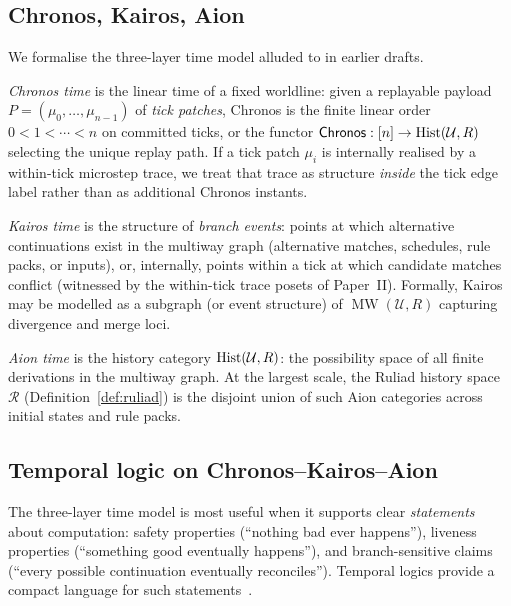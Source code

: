 \documentclass{aion}
\DeclareMathOperator{\MW}{MW}
\newcommand{\Ruliad}{\mathcal{R}}
\newcommand{\Chronos}{\mathsf{Chronos}}
\begin{document}
\subsection{Chronos, Kairos, Aion}
\label{subsec:chronos-kairos-aion}

We formalise the three-layer time model alluded to in earlier drafts.

\begin{definition}[Chronos]\label{def:chronos}
\emph{Chronos time} is the linear time of a fixed worldline:
given a replayable payload $P=(\mu_0,\ldots,\mu_{n-1})$ of \emph{tick patches}, Chronos is the finite linear order
$0<1<\cdots<n$ on committed ticks, or the functor $\Chronos:[n]\to\Hist(\mathcal{U},R)$ selecting the unique replay path.
If a tick patch $\mu_i$ is internally realised by a within-tick microstep trace, we treat that trace as structure \emph{inside}
the tick edge label rather than as additional Chronos instants.
\end{definition}

\begin{definition}[Kairos]\label{def:kairos}
\emph{Kairos time} is the structure of \emph{branch events}:
points at which alternative continuations exist in the multiway graph (alternative matches, schedules, rule packs, or inputs),
or, internally, points within a tick at which candidate matches conflict (witnessed by the within-tick trace posets of Paper~II).
Formally, Kairos may be modelled as a subgraph (or event structure) of $\MW(\mathcal{U},R)$ capturing divergence and merge loci.
\end{definition}

\begin{definition}[Aion]\label{def:aion}
\emph{Aion time} is the history category $\operatorname{Hist}(\mathcal{U},R)$: the possibility space of all finite derivations in the multiway graph.
At the largest scale, the Ruliad history space $\Ruliad$ (Definition~\ref{def:ruliad}) is the disjoint union of such Aion categories across initial states and rule packs.
\end{definition}

\subsection{Temporal logic on Chronos--Kairos--Aion}
\label{subsec:temporal-logic}

The three-layer time model is most useful when it supports clear \emph{statements} about computation:
safety properties (``nothing bad ever happens''), liveness properties (``something good eventually happens''),
and branch-sensitive claims (``every possible continuation eventually reconciles'').
Temporal logics provide a compact language for such statements~\cite{Pnu77,CES86}.
\end{document}
